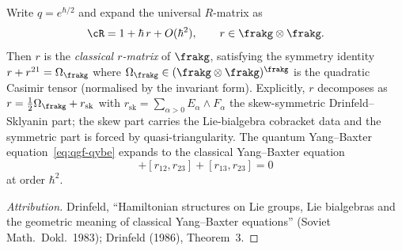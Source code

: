 \begin{proposition}
\label{prop:qgf-classical-limit-r}
Write $q = e^{\hbar/2}$ and expand the universal $R$-matrix as
\begin{equation}
 \cR = 1 + \hbar \, r + O(\hbar^2), \qquad r \in \frakg \otimes \frakg.
 \label{eq:qgf-R-expansion}
\end{equation}
Then $r$ is the \emph{classical $r$-matrix} of $\frakg$, satisfying the symmetry identity $r + r^{21} = \Omega_{\frakg}$ where $\Omega_{\frakg} \in (\frakg \otimes \frakg)^{\frakg}$ is the quadratic Casimir tensor (normalised by the invariant form). Explicitly, $r$ decomposes as $r = \tfrac{1}{2}\Omega_{\frakg} + r_{\mathrm{sk}}$ with $r_{\mathrm{sk}} = \sum_{\alpha > 0} E_\alpha \wedge F_\alpha$ the skew-symmetric Drinfeld--Sklyanin part; the skew part carries the Lie-bialgebra cobracket data and the symmetric part is forced by quasi-triangularity. The quantum Yang--Baxter equation~\eqref{eq:qgf-qybe} expands to the classical Yang--Baxter equation
\begin{equation}
 [r_{12}, r_{13}] + [r_{12}, r_{23}] + [r_{13}, r_{23}] = 0
 \label{eq:qgf-cybe}
\end{equation}
at order $\hbar^2$.
\end{proposition}

\begin{proof}[Attribution]
Drinfeld, ``Hamiltonian structures on Lie groups, Lie bialgebras and the geometric meaning of classical Yang--Baxter equations'' (Soviet Math.\ Dokl.\ 1983); Drinfeld (1986), Theorem~3.
\end{proof}


